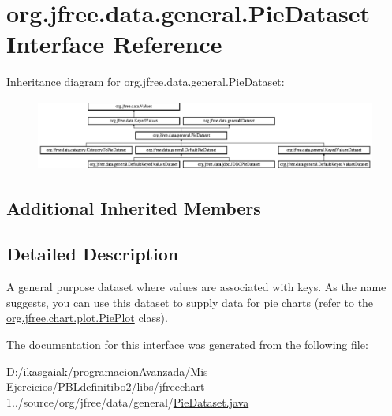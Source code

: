 \hypertarget{interfaceorg_1_1jfree_1_1data_1_1general_1_1_pie_dataset}{}\section{org.\+jfree.\+data.\+general.\+Pie\+Dataset Interface Reference}
\label{interfaceorg_1_1jfree_1_1data_1_1general_1_1_pie_dataset}
Inheritance diagram for org.\+jfree.\+data.\+general.\+Pie\+Dataset\+:\begin{figure}[H]
\begin{center}
\leavevmode
\includegraphics[height=2.295082cm]{interfaceorg_1_1jfree_1_1data_1_1general_1_1_pie_dataset}
\end{center}
\end{figure}
\subsection*{Additional Inherited Members}


\subsection{Detailed Description}
A general purpose dataset where values are associated with keys. As the name suggests, you can use this dataset to supply data for pie charts (refer to the \mbox{\hyperlink{classorg_1_1jfree_1_1chart_1_1plot_1_1_pie_plot}{org.\+jfree.\+chart.\+plot.\+Pie\+Plot}} class). 

The documentation for this interface was generated from the following file\+:\begin{DoxyCompactItemize}
\item 
D\+:/ikasgaiak/programacion\+Avanzada/\+Mis Ejercicios/\+P\+B\+Ldefinitibo2/libs/jfreechart-\/1../source/org/jfree/data/general/\mbox{\hyperlink{_pie_dataset_8java}{Pie\+Dataset.\+java}}\end{DoxyCompactItemize}
